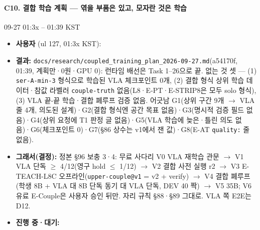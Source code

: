 \paragraph{C10. 결합 학습 계획 --- 엮을 부품은 있고, 모자란 것은 학습}
{\small 09-27 01:3x -- 01:39 KST}
\begin{itemize}
  \item \textbf{사용자} (ul 127, 01:3x KST): 
  \item \textbf{결과:} \texttt{docs/\allowbreak{}research/\allowbreak{}coupled\_\allowbreak{}training\_\allowbreak{}plan\_\allowbreak{}2026-\allowbreak{}09-\allowbreak{}27.\allowbreak{}md}(a54170f, 01:39, 계획만·0원·GPU 0): 런타임 배선은 Task 1--26으로 끝. 없는 것 셋 --- (1) \texttt{ser-\allowbreak{}A-\allowbreak{}min-\allowbreak{}3} 형식으로 학습된 VLA 체크포인트 0개, (2) 결합 형식 상위 학습 데이터·참값 라벨러 \texttt{couple-\allowbreak{}truth} 없음(L8·E-PT·E-STRIP8은 모두 solo 형식), (3) VLA 끝-끝 학습·결합 폐루프 검증 없음. 어긋남 G1(상위 구간 9개 $\rightarrow$ VLA 줄 4개, 의도된 설계)·G2(결합 형식엔 공간 목표 없음)·G3(명시적 검증 필드 없음)·G4(상위 요청에 T1 판정 글 없음)·G5(VLA 학습에 늦은·틀린 의도 없음)·G6(체크포인트 0)·G7(§86 상수는 v1에서 잰 값)·G8(E-AT \texttt{quality:} 줄 없음).
  \item \textbf{그래서(결정):} 정본 §96 보충 3·4: 무료 사다리 V0 VLA 재학습 관문 $\rightarrow$ V1 VLA 단독 $\geq$ 4/12(영구 hold $\leq$ 1/12) $\rightarrow$ V2 결합 사전 실행 r2 $\rightarrow$ V3 E-TEACH-L8C 오프라인(\texttt{upper-\allowbreak{}couple@v1} = v2 + verify) $\rightarrow$ V4 결합 폐루프(학생 8B + VLA 대 8B 단독 동기 대 VLA 단독, DEV 40 짝) $\rightarrow$ V5 35B; V6 유료 E-Couple은 사용자 승인 뒤만. 자리 규칙 §88·§89 그대로. VLA 쪽 E2E는 D12.
  \item \textbf{진행 중·대기:} 
\end{itemize}

